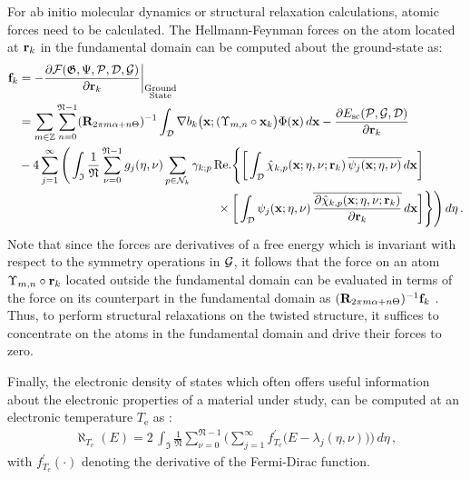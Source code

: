 \documentclass[preprint,12pt, 3p, sort&compress]{elsarticle}
\begin{document}
For ab initio molecular dynamics or structural relaxation calculations, atomic forces need to be calculated. The Hellmann-Feynman forces on the atom located at ${\bf r}_k$ in the fundamental domain can be computed about the ground-state as:
\begin{align}
\nonumber
\mathbf{f}_k &= -\frac{\partial{{\cal F}}(\mathfrak{G}, \Psi, {\cal P}, {{\cal D}}, {\cal G})}{\partial{\bf r}_k}\bigg\lvert_{\substack{\text{Ground}\\ \text{State}}}
\\\nonumber &= \sum_{m \in \mathbb{Z}}\sum_{n = 0}^{\mathfrak{N}-1}({\bf R}_{2\pi m \alpha + n\Theta})^{-1} \int_{{{\cal D}}}\nabla b_{k}\big({\bf x};(\Upsilon_{m,n}\circ {\bf x}_k \big)\Phi({\bf x})\,d{\bf x} - \frac{\partial E_{\text{sc}}({\cal P},{\cal G}, {{\cal D}})}{\partial{\bf r}_k}\\\nonumber
&-4\sum_{j=1}^{\infty}\Bigg(\int_{\mathfrak{I}} \frac{1}{\mathfrak{N}}\sum_{\nu = 0}^{\mathfrak{N}-1} g_j(\eta, \nu)\sum_{p \in \mathcal{N}_k}\gamma_{k;p}\,\text{Re.}\Bigg\{\bigg[\int_{{{\cal D}}} \hat{\chi}_{k,p}({\bf x};\eta, \nu;{\bf r}_k)\,\overline{\psi_j({\bf x};\eta, \nu)}\,d{\bf x}\bigg]\\
&\quad\quad\quad\quad\quad\quad\quad\quad\quad\quad\;\,\quad\quad\quad\quad\quad\quad\times\bigg[\int_{{{\cal D}}} \psi_j({\bf x};\eta, \nu)\,\overline{\frac{\partial\hat{\chi}_{k,p}({\bf x};\eta, \nu;{\bf r}_k)}{\partial{\bf r}_k}}\,d{\bf x}\bigg]
\Bigg\}\Bigg)\,d\eta\,.
\label{eq:Hellman_Feynman_Force}
\end{align}
Note that since the forces are derivatives of a free energy which is invariant with respect to the symmetry operations in ${\cal G}$, it follows that the force on an atom $\Upsilon_{m,n}\circ{\bf r}_{k}$ located outside the fundamental domain can be evaluated in terms of the force on its counterpart in the fundamental domain as $({\bf R}_{2\pi m \alpha + n\Theta})^{-1}{\bf f}_{k}$  \citep{Dumitrica_James_OMD}. Thus, to perform structural relaxations on the twisted structure, it suffices to concentrate on the atoms in the fundamental domain and drive their forces to zero.

Finally, the electronic density of states which often offers useful information about the electronic properties of a material under study, can be computed at an electronic temperature $T_{\text{e}}$ as \citep{Defranceschi_LeBris}:
\begin{align}
\aleph_{T_{\text{e}}}(E) =2\,\int_{\mathfrak{I}} \frac{1}{\mathfrak{N}}\sum_{\nu = 0}^{\mathfrak{N}-1}\bigg(\sum_{j=1}^{\infty} f^\prime_{T_{\text{e}}}\big(E - \lambda_j(\eta,\nu)\big)\bigg)\,d\eta\,,
\end{align}
with $f^\prime_{T_{\text{e}}}(\cdot)$ denoting the derivative of the Fermi-Dirac function.
\end{document}
